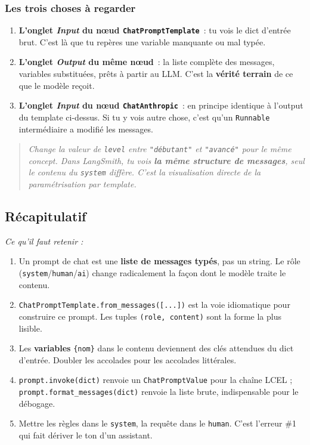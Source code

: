 \documentclass[11pt,a4paper]{article}
\begin{document}
\subsubsection*{Les trois choses à regarder}

\begin{enumerate}[leftmargin=*]
  \item \textbf{L'onglet \emph{Input} du nœud \texttt{ChatPromptTemplate}}~: tu
        vois le dict d'entrée brut. C'est là que tu repères une variable
        manquante ou mal typée.
  \item \textbf{L'onglet \emph{Output} du même nœud}~: la liste complète des
        messages, variables substituées, prêts à partir au LLM. C'est la
        \textbf{vérité terrain} de ce que le modèle reçoit.
  \item \textbf{L'onglet \emph{Input} du nœud \texttt{ChatAnthropic}}~: en
        principe identique à l'output du template ci-dessus. Si tu y vois
        autre chose, c'est qu'un \texttt{Runnable} intermédiaire a modifié
        les messages.
\end{enumerate}

\begin{quote}\itshape
Change la valeur de \texttt{level} entre \texttt{"débutant"} et
\texttt{"avancé"} pour le \emph{même} concept. Dans LangSmith, tu vois
\textbf{la même structure de messages}, seul le contenu du \texttt{system}
diffère. C'est la visualisation directe de la paramétrisation par template.
\end{quote}

\subsection*{Récapitulatif}
{\itshape\sloppy
\textit{Ce qu'il faut retenir :}
\begin{enumerate}[leftmargin=*]
  \item Un prompt de chat est une \textbf{liste de messages typés}, pas un
        string. Le rôle (\texttt{system}/\texttt{human}/\texttt{ai}) change
        radicalement la façon dont le modèle traite le contenu.
  \item \texttt{ChatPromptTemplate.from\_messages([...])} est la voie
        idiomatique pour construire ce prompt. Les tuples \texttt{(role,
        content)} sont la forme la plus lisible.
  \item Les \textbf{variables} \texttt{\{nom\}} dans le contenu deviennent
        des clés attendues du dict d'entrée. Doubler les accolades pour les
        accolades littérales.
  \item \texttt{prompt.invoke(dict)} renvoie un \texttt{ChatPromptValue}
        pour la chaîne LCEL ; \texttt{prompt.format\_messages(dict)} renvoie
        la liste brute, indispensable pour le débogage.
  \item Mettre les règles dans le \texttt{system}, la requête dans le
        \texttt{human}. C'est l'erreur \#1 qui fait dériver le ton d'un
        assistant.
\end{enumerate}
\par}
\end{document}
